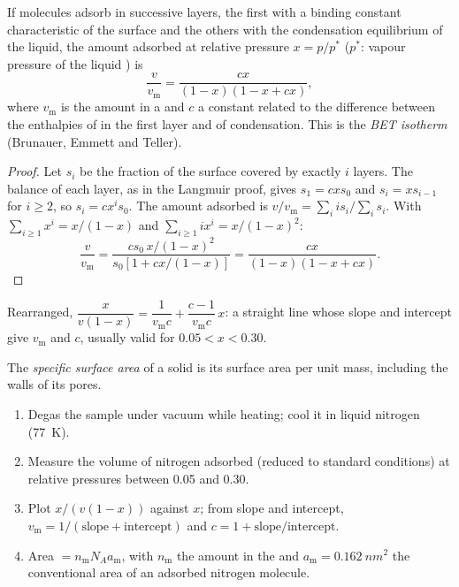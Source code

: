 \begin{theorem}\label{thm:b3:surfaces-catalysis:bet}
If molecules adsorb in successive layers, the first with a binding constant
characteristic of the surface and the others with the condensation equilibrium
of the liquid, the amount adsorbed at relative pressure $x = p/p^*$ ($p^*$: vapour
pressure of the liquid ) is
\[
  \frac{v}{v_{\mathrm m}} = \frac{cx}{(1 - x)(1 - x + cx)},
\]
where $v_{\mathrm m}$ is the amount in a  and $c$ a constant related to the
difference between the enthalpies of  in the first layer and of
condensation. This is the \emph{BET isotherm} (Brunauer,
Emmett and Teller).
\end{theorem}

\begin{proof}
Let $s_i$ be the fraction of the surface covered by exactly $i$ layers. The
balance of each layer, as in the Langmuir proof, gives $s_1 = cxs_0$ and $s_i =
xs_{i-1}$ for $i \ge 2$, so $s_i = cx^is_0$. The amount adsorbed is $v/v_{\mathrm m} =
\sum_iis_i/\sum_is_i$. With $\sum_{i\ge1}x^i = x/(1 - x)$ and $\sum_{i\ge1}ix^i = x/(1 - x)^2$:
\[
  \frac{v}{v_{\mathrm m}} = \frac{cs_0\,x/(1 - x)^2}{s_0[1 + cx/(1 - x)]} = \frac{cx}{(1 - x)(1 - x + cx)} .
\]
\end{proof}

Rearranged, $\dfrac{x}{v(1 - x)} = \dfrac{1}{v_{\mathrm m}c} + \dfrac{c - 1}{v_{\mathrm m}c}\,x$: a straight line whose slope and
intercept give $v_{\mathrm m}$ and $c$, usually valid for $0.05 < x < 0.30$.

\begin{definition}\label{def:b3:surfaces-catalysis:surface-area}
The \emph{specific surface area} of a solid is its
surface area per unit mass, including the walls of its pores.
\end{definition}

\begin{method}\label{met:b3:surfaces-catalysis:bet-area}
\begin{enumerate}
  \item Degas the sample under vacuum while heating; cool it in liquid nitrogen
        (\qty{77}{K}).
  \item Measure the volume of nitrogen adsorbed (reduced to standard conditions)
        at relative pressures between 0.05 and 0.30.
  \item Plot $x/(v(1 - x))$ against $x$; from slope and intercept,
        $v_{\mathrm m} = 1/(\text{slope} + \text{intercept})$ and $c = 1 + \text{slope}/\text{intercept}$.
  \item Area $= n_{\mathrm m}N_Aa_{\mathrm m}$, with $n_{\mathrm m}$ the amount in the  and $a_{\mathrm m} = \qty{0.162}{nm^2}$
        the conventional area of an adsorbed nitrogen molecule.
\end{enumerate}
\end{method}

